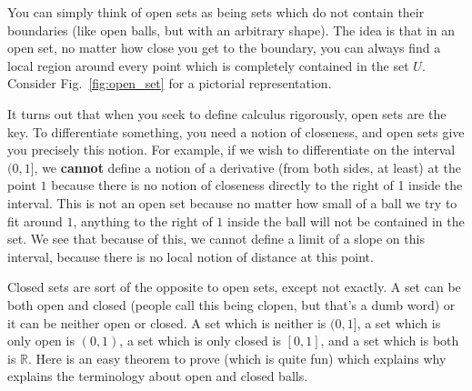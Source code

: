 	You can simply think of open sets as being sets which do not contain their boundaries (like open balls, but with an arbitrary shape). The idea is that in an 
	open set, no matter how close you get to the boundary, you can always find a local region around every point which is completely contained in the set $U$. 
	Consider Fig.~\eqref{fig:open_set} for a pictorial representation.
	
	It turns out that when you seek to define calculus rigorously, open sets are the key. To differentiate something, you need a notion of closeness, and 
	open sets give you precisely this notion. For example, if we wish to differentiate on the interval $(0, 1]$, we \textbf{cannot} define a notion of a derivative 
	(from both sides, at least) at the point $1$ because there is no notion of closeness directly to the right of 1 inside the interval. This is not an open set 
	because no matter how small of a ball we try to fit around $1$, anything to the right of $1$ inside the ball will not be contained in the set. We see that 
	because of this, we cannot define a limit of a slope on this interval, because there is no local notion of distance at this point.
	
	Closed sets are sort of the opposite to open sets, except not exactly. A set can be both open and closed (people call this being clopen, but that's a dumb 
	word) or it can be neither open or closed. A set which is neither is $(0, 1]$, a set which is only open is $(0, 1)$, a set which is only closed is $[0, 1]$, 
	and a set which is both is $\mathbb R$. Here is an easy theorem to prove (which is quite fun) which explains why explains the terminology about open 
	and closed balls.
	
